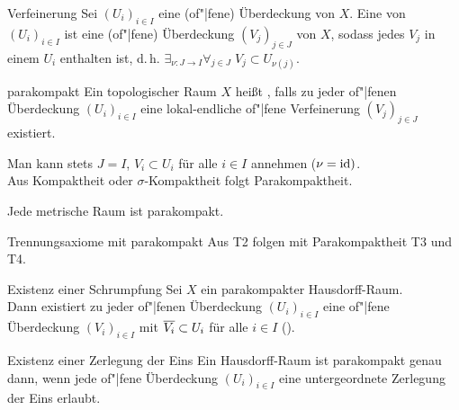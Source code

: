 \linie

\begin{Def}{Verfeinerung}
    Sei $(U_i)_{i \in I}$ eine (of"|fene) Überdeckung von $X$.
    Eine  von $(U_i)_{i \in I}$ ist eine
    (of"|fene) Überdeckung $(V_j)_{j \in J}$ von $X$, sodass jedes $V_j$
    in einem $U_i$ enthalten ist, d.\,h.
    $\exists_{\nu\colon J \rightarrow I} \forall_{j \in J}\;
    V_j \subset U_{\nu(j)}$.
\end{Def}

\begin{Def}{parakompakt}
    Ein topologischer Raum $X$ heißt , falls zu jeder
    of"|fenen Überdeckung $(U_i)_{i \in I}$ eine lokal-endliche of"|fene
    Verfeinerung $(V_j)_{j \in J}$ existiert.
\end{Def}

\begin{Bem}
    Man kann stets $J = I$, $V_i \subset U_i$ für alle $i \in I$ annehmen
    ($\nu = \operatorname{id})$. \\
    Aus Kompaktheit oder $\sigma$-Kompaktheit folgt Parakompaktheit.
\end{Bem}

\begin{Satz}{}
    Jede metrische Raum ist parakompakt.
\end{Satz}

\linie

\begin{Lemma}{Trennungsaxiome mit parakompakt}
    Aus T2 folgen mit Parakompaktheit T3 und T4.
\end{Lemma}

\linie

\begin{Lemma}{Existenz einer Schrumpfung}
    Sei $X$ ein parakompakter Hausdorff-Raum. \\
    Dann existiert zu jeder of"|fenen Überdeckung $(U_i)_{i \in I}$ eine
    of"|fene Überdeckung $(V_i)_{i \in I}$ mit $\overline{V_i} \subset U_i$
    für alle $i \in I$ ().
\end{Lemma}

\begin{Satz}{Existenz einer Zerlegung der Eins}
    Ein Hausdorff-Raum ist parakompakt genau dann, wenn jede of"|fene
    Überdeckung $(U_i)_{i \in I}$ eine untergeordnete Zerlegung der Eins
    erlaubt.
\end{Satz}

\pagebreak

